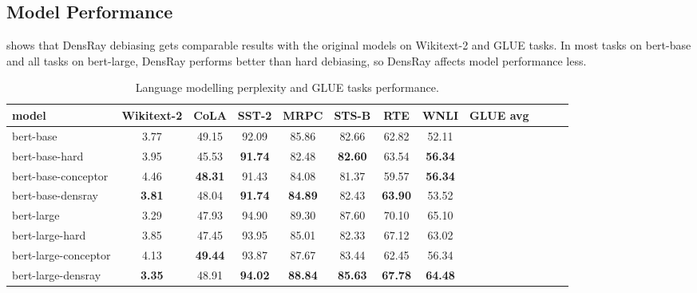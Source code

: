 \subsection{Model Performance}
 shows that DensRay debiasing gets comparable results with
the original models on Wikitext-2 and GLUE tasks. In most tasks on bert-base and all tasks on bert-large, DensRay performs better than hard debiasing, so DensRay affects model performance less.
\begin{table}[h]
\centering
\footnotesize
\begin{tabular}{l||c|cccccccccc}
model & Wikitext-2&CoLA &SST-2&MRPC&STS-B&RTE&WNLI&GLUE avg\\
\hline\hline
		bert-base &3.77&49.15&92.09&85.86&82.66&62.82&52.11\\
bert-base-hard &3.95&45.53&\textbf{91.74}&82.48&\textbf{82.60}&63.54&\textbf{56.34}\\
bert-base-conceptor &4.46&\textbf{48.31}&91.43&84.08&81.37&59.57&\textbf{56.34}\\
bert-base-densray &\textbf{3.81}&48.04&\textbf{91.74}&\textbf{84.89}&82.43&\textbf{63.90}&53.52\\
\hline
bert-large &3.29& 47.93&94.90&89.30&87.60&70.10&65.10\\
bert-large-hard &3.85& 47.45&93.95&85.01&82.33&67.12&63.02\\
bert-large-conceptor &4.13&\textbf{49.44}&93.87&87.67&83.44&62.45&56.34\\
bert-large-densray &\textbf{3.35}& 48.91&\textbf{94.02}&\textbf{88.84}&\textbf{85.63}&\textbf{67.78}&\textbf{64.48}\\
\end{tabular}
\caption{
Language modelling perplexity and GLUE tasks
performance. }
\end{table}


